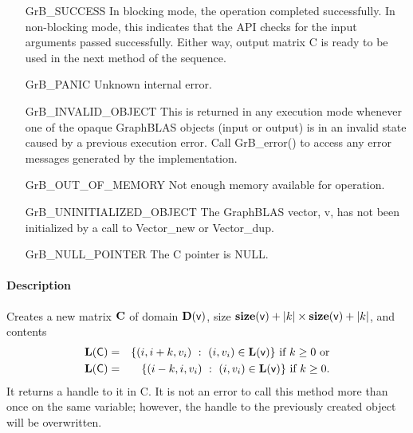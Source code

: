 \begin{itemize}[leftmargin=2.1in]
    \item[{\sf GrB\_SUCCESS}]         In blocking mode, the operation completed
    successfully. In non-blocking mode, this indicates that the API checks 
    for the input arguments passed successfully. Either way, output matrix 
    {\sf C} is ready to be used in the next method of the sequence.

    \item[{\sf GrB\_PANIC}]           Unknown internal error.
    
    \item[{\sf GrB\_INVALID\_OBJECT}] This is returned in any execution mode 
    whenever one of the opaque GraphBLAS objects (input or output) is in an invalid 
    state caused by a previous execution error.  Call {\sf GrB\_error()} to access 
    any error messages generated by the implementation.

    \item[{\sf GrB\_OUT\_OF\_MEMORY}] Not enough memory available for operation.
    
    \item[{\sf GrB\_UNINITIALIZED\_OBJECT}]  The GraphBLAS vector, {\sf v}, has 
    not been initialized by a call to {\sf Vector\_new} or {\sf Vector\_dup}.
    
    \item[{\sf GrB\_NULL\_POINTER}]   The {\sf C} pointer is {\sf NULL}.
\end{itemize}

\paragraph{Description}

Creates a new matrix ${\bf C}$ of domain $\mathbf{D}({\sf v})$, size 
$\mathbf{size}({\sf v}) + |k| \times \mathbf{size}({\sf v}) + |k|$, and contents 
\begin{eqnarray*}
\mathbf{L}({\sf C}) & = & \{ (i, i + k, v_i) ~:~ (i, v_i) \in \mathbf{L}({\sf v})\} \mbox{~if~} k \ge 0
\mbox{~or} \\
\mathbf{L}({\sf C}) & = & \{ (i - k, i, v_i) ~:~ (i, v_i) \in \mathbf{L}({\sf v})\} \mbox{~if~} k \ge 0.
\end{eqnarray*}
It returns a handle to it in {\sf C}.  It is not an error to call this method 
more than once on the same variable; however, the handle to the previously 
created object will be overwritten. 

